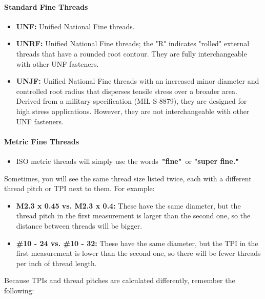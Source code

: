 \documentclass[english,]{article}
\providecommand{\tightlist}{%
  \setlength{\itemsep}{0pt}\setlength{\parskip}{0pt}}
\let\oldparagraph\paragraph
\renewcommand{\paragraph}[1]{\oldparagraph{#1}\mbox{}}
\begin{document}
\hypertarget{ixrtlg}{%
\paragraph{Standard Fine Threads}\label{ixrtlg}}

\begin{itemize}
\tightlist
\item
  \textbf{UNF:} Unified National Fine threads.
\item
  \textbf{UNRF:} Unified National Fine threads; the "R" indicates
  "rolled" external threads that have a rounded root contour. They are
  fully interchangeable with other UNF fasteners.
\item
  \textbf{UNJF:} Unified National Fine threads with an increased minor
  diameter and controlled root radius that disperses tensile stress over
  a broader area. Derived from a military specification (MIL-S-8879),
  they are designed for high stress applications. However, they are not
  interchangeable with other UNF fasteners.
\end{itemize}

\hypertarget{ipqpdr}{%
\paragraph{Metric Fine Threads}\label{ipqpdr}}

\begin{itemize}
\tightlist
\item
  ISO metric threads will simply use the words~\textbf{"fine"}{~or
  \textbf{"super fine."}}
\end{itemize}

\hypertarget{ie6q5l}{}
Sometimes, you will see the same thread size listed twice, each with a
different thread pitch or TPI next to them. For example:

\begin{itemize}
\tightlist
\item
  \textbf{M2.3 x 0.45 vs. M2.3 x 0.4:} These have the same diameter, but
  the thread pitch in the first measurement is larger than the second
  one, so the distance between threads will be bigger.
\item
  \textbf{\#10 - 24 vs. \#10 - 32:} These have the same diameter, but
  the TPI in the first measurement is lower than the second one, so
  there will be fewer threads per inch of thread length.
\end{itemize}

\hypertarget{iivm5l}{}
Because TPIs and thread pitches are calculated differently, remember the
following:
\end{document}
